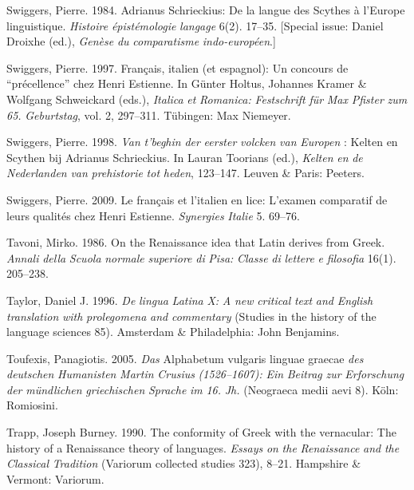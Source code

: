 Swiggers, Pierre. 1984. Adrianus Schrieckius: De la langue des Scythes à l’Europe linguistique. \textit{Histoire} \textit{épistémologie} \textit{langage} 6(2). 17–35. [Special issue: Daniel Droixhe (ed.), \textit{Genèse} \textit{du} \textit{comparatisme} \textit{indo-européen}.]

Swiggers, Pierre. 1997. Français, italien (et espagnol): Un concours de “précellence” chez Henri Estienne. In Günter Holtus, Johannes Kramer \& Wolfgang Schweickard (eds.), \textit{Italica} \textit{et} \textit{Romanica:} \textit{Festschrift} \textit{für} \textit{Max} \textit{Pfister} \textit{zum} \textit{65.} \textit{Geburtstag}, vol. 2, 297–311. Tübingen: Max Niemeyer.

Swiggers, Pierre. 1998. \textit{Van} \textit{t’beghin} \textit{der} \textit{eerster} \textit{volcken} \textit{van} \textit{Europen} : Kelten en Scythen bij Adrianus Schrieckius. In Lauran Toorians (ed.), \textit{Kelten} \textit{en} \textit{de} \textit{Nederlanden} \textit{van} \textit{prehistorie} \textit{tot} \textit{heden}, 123–147. Leuven \& Paris: Peeters.

Swiggers, Pierre. 2009. Le français et l’italien en lice: L’examen comparatif de leurs qualités chez Henri Estienne. \textit{Synergies} \textit{Italie} 5. 69–76.

Tavoni, Mirko. 1986. On the Renaissance idea that Latin derives from Greek. \textit{Annali} \textit{della} \textit{Scuola} \textit{normale} \textit{superiore} \textit{di} \textit{Pisa:} \textit{Classe} \textit{di} \textit{lettere} \textit{e} \textit{filosofia} 16(1). 205–238.

Taylor, Daniel J. 1996. \textit{De} \textit{lingua} \textit{Latina} \textit{X:} \textit{A} \textit{new} \textit{critical} \textit{text} \textit{and} \textit{English} \textit{translation} \textit{with} \textit{prolegomena} \textit{and} \textit{commentary} (Studies in the history of the language sciences 85). Amsterdam \& Philadelphia: John Benjamins.

Toufexis, Panagiotis. 2005. \textit{Das} Alphabetum vulgaris linguae graecae \textit{des} \textit{deutschen} \textit{Humanisten} \textit{Martin} \textit{Crusius} \textit{(1526–1607):} \textit{Ein} \textit{Beitrag} \textit{zur} \textit{Erforschung} \textit{der} \textit{mündlichen} \textit{griechischen} \textit{Sprache} \textit{im} \textit{16.} \textit{Jh.} (Neograeca medii aevi 8). Köln: Romiosini.

Trapp, Joseph Burney. 1990. The conformity of Greek with the vernacular: The history of a Renaissance theory of languages. \textit{Essays} \textit{on} \textit{the} \textit{Renaissance} \textit{and} \textit{the} \textit{Classical} \textit{Tradition} (Variorum collected studies 323), 8–21. Hampshire \& Vermont: Variorum.

